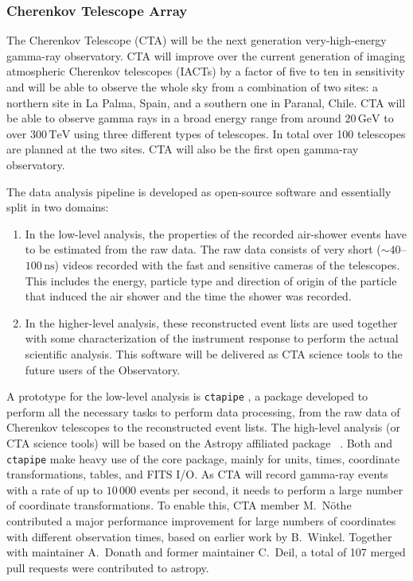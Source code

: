 \documentclass[modern]{aastex631}
\newcommand{\secauthor}[1]{{\color{blue}Author:~\textit{#1}}}
\newcommand{\secunfilled}{{\color{red}Author:~\textit{Looking for volunteers!}}}
\begin{document}

\subsubsection{Cherenkov Telescope Array}

The Cherenkov Telescope (CTA) will be the next generation very-high-energy
gamma-ray observatory.
CTA will improve over the current generation of imaging atmospheric Cherenkov telescopes (IACTs)
by a factor of five to ten in sensitivity and will be able to observe the whole sky from a combination of two sites:
a northern site in La Palma, Spain, and a southern one in Paranal, Chile.
CTA will be able to observe gamma rays in a broad energy range from around $20\,\mathrm{GeV}$ to over $300\,\mathrm{TeV}$
using three different types of telescopes. In total over 100 telescopes are planned at the two sites.
CTA will also be the first open gamma-ray observatory.

The data analysis pipeline is developed as open-source software and essentially split in two domains:
\begin{enumerate}
  \item In the low-level analysis, the properties of the recorded air-shower events
    have to be estimated from the raw data.
    The raw data consists of very short ($\sim40$--$100\,\mathrm{ns}$) videos recorded with the fast and
    sensitive cameras of the telescopes.
    This includes the energy, particle type and direction of origin of the particle that induced the air shower
    and the time the shower was recorded.
  \item In the higher-level analysis, these reconstructed event lists are used together with some
    characterization of the instrument response to perform the actual scientific analysis.
    This software will be delivered as CTA science tools to the future users of the Observatory.
\end{enumerate}

A prototype for the low-level analysis is \texttt{ctapipe} \citep{ctapipe},
a \python package developed to perform all the necessary tasks to perform data processing, from the raw data
of Cherenkov telescopes to the reconstructed event lists.
The high-level analysis (or CTA science tools) will be based on the Astropy affiliated package
~\citep{gammapy}.
Both  and \texttt{ctapipe} make heavy use of the \astropy core package, mainly for units, times, coordinate transformations,
tables, and FITS I/O.
As CTA will record gamma-ray events with a rate of up to $10\,000$ events per second,
it needs to perform a large number of coordinate transformations.
To enable this, CTA member M.~Nöthe contributed a major performance improvement
for large numbers of coordinates with different observation times,
based on earlier work by B.~Winkel.
Together with  maintainer A.~Donath and former maintainer C.~Deil,
a total of 107 merged pull requests were contributed to astropy.
\end{document}
